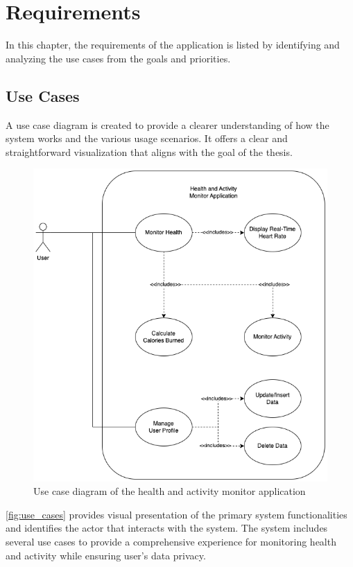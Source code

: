 \section{Requirements}
\label{chap:requirements}
In this chapter, the requirements of the application is listed by identifying and analyzing the use cases from the goals and priorities.

\subsection{Use Cases}
\label{chap:use_case}
A use case diagram is created to provide a clearer understanding of how the system works and the various usage scenarios. It offers a clear and straightforward visualization that aligns with the goal of the thesis.
\begin{figure}[H]
    \centering
    \includegraphics[width=1\textwidth]{diagrams/usecase.drawio.png}
    \caption{Use case diagram of the health and activity monitor application}
    \label{fig:use_cases}
\end{figure}
\newpage
\autoref{fig:use_cases} provides visual presentation of the primary system functionalities and identifies the actor that interacts with the system.
The system includes several use cases to provide a comprehensive experience for monitoring health and activity while ensuring user's data privacy.

